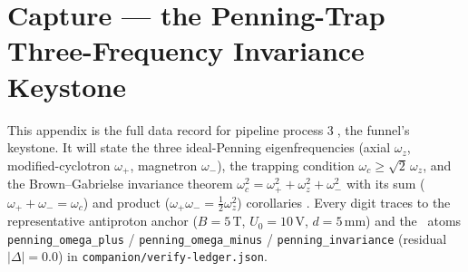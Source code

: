 \section{Capture --- the Penning-Trap Three-Frequency Invariance Keystone}
\label{app:penning}

This appendix is the full data record for pipeline process
\textcircled{\scriptsize 3}, the funnel's keystone. It will state the three
ideal-Penning eigenfrequencies (axial $\omega_z$, modified-cyclotron
$\omega_+$, magnetron $\omega_-$), the trapping condition
$\omega_c\ge\sqrt2\,\omega_z$, and the Brown--Gabrielse invariance theorem
$\omega_c^2=\omega_+^2+\omega_z^2+\omega_-^2$ with its sum
($\omega_++\omega_-=\omega_c$) and product
($\omega_+\omega_-=\tfrac12\omega_z^2$) corollaries
\citep{brown1986geonium,dehmelt1990}. Every digit traces to the
representative antiproton anchor ($B=5$\,T, $U_0=10$\,V, $d=5$\,mm) and the
\tierGreen\ atoms \texttt{penning\_omega\_plus} / \texttt{penning\_omega\_minus}
/ \texttt{penning\_invariance} (residual $|\Delta|=0.0$) in
\texttt{companion/verify-ledger.json}.

